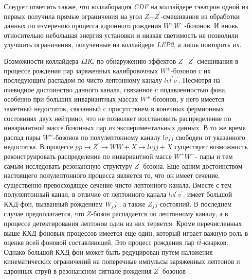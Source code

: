 Следует отметить также, что коллаборация \textit{CDF} на коллайдере тэватрон одной из первых получила прямые ограничения на угол $Z$−$Z^\prime$-смешивания из обработки данных по измерению процесса адронного рождения $W^+W^−$-бозонов. И вновь относительно небольшая энергия установки и низкая светимость не позволили улучшить ограничения, полученные на коллайдере \textit{LEP2}, а лишь повторить их.

Возможности коллайдера \textit{LНС} по обнаружению эффектов $Z$−$Z^\prime$-смешивания в процессе рождения пар заряженных калибровочных $W^±$-бозонов с их последующим распадом по чисто лептонному каналу $lvl^\prime v^\prime$. Несмотря на очевидное достоинство данного канала, связанное с подавленностью фона, особенно при больших инвариантных массах $W^±$-бозонов, у него имеется заметный недостаток, связанный с присутствием в конечных фермионных состояниях двух нейтрино, что не позволяет восстановить распределение по инвариантной массе бозонных пар из экспериментальных данных. В то же время распад пары $W^±$-бозонов по полулептонному каналу $lvjj$ свободен от указанного недостатка. В процессе $pp \rightarrow Z^\prime \rightarrow WW + X \rightarrow lvjj + X$ существует возможность реконструировать распределение по инвариантной массе $W^+W^-$- пары и тем самым исследовать резонансную структуру $Z^\prime$-бозона. Еще одним достоинством настоящего полулептонного процесса является то, что он имеет сечение, существенно превосходящее сечение чисто лептонного канала. Вместе с тем полулептонный канал, в отличие от лептонного канала $lvl^\prime v^\prime$, имеет большой КХД-фон, вызванный рождением $W_jj$-, а также $Z_jj$-состояний. В последнем случае предполагается, что $Z$-бозон распадается по лептонному каналу, а в процессе детектирования лептонов один из них теряется. Кроме перечисленных выше КХД фоновых процессов имеется еще один, который играет важную роль в оценке всей фоновой составляющей. Это процесс рождения пар $t\bar{t}$-кварков. Однако большой КХД-фон может быть редуцирован путем наложения кинематических ограничений на поперечные импульсы заряженных лептонов и адронных струй в резонансном сигнале рождения $Z^\prime$-бозонов~\cite{Bobovnikov:2016}.

